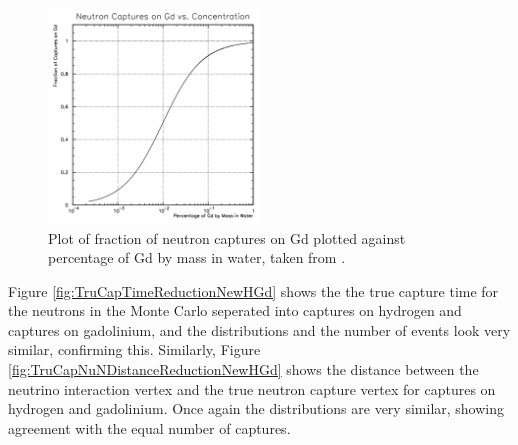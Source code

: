 \begin{figure}
    \centering 
    \includegraphics[width=0.5\textwidth]{Figures/no_captures_gd.PNG}
    \caption[Plot of fraction of neutron captures on Gd plotted against percentage of Gd by mass in water.]{Plot of fraction of neutron captures on Gd plotted against percentage of Gd by mass in water, taken from \cite{osti_915115}.}
    \label{fig:dwall_effwall_fv}
\end{figure} 
              



Figure \ref{fig:TruCapTimeReductionNewHGd} shows the the true capture time for the neutrons in the Monte Carlo seperated into captures on hydrogen and captures on gadolinium, and the distributions and the number of events look very similar, confirming this. Similarly, Figure \ref{fig:TruCapNuNDistanceReductionNewHGd} shows the distance between the neutrino interaction vertex and the true neutron capture vertex for captures on hydrogen and gadolinium. Once again the distributions are very similar, showing agreement with the equal number of captures.


